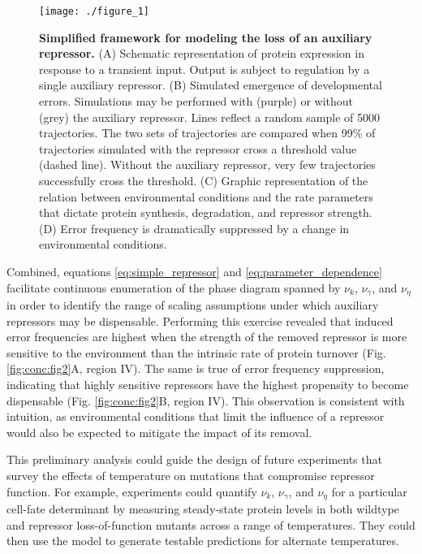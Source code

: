 \begin{figure}[h!]
\centering
\texttt{[image: ./figure\_1]}
\caption[Simplified framework for modeling the loss of an auxiliary repressor.]{\textbf{Simplified framework for modeling the loss of an auxiliary repressor.} (A) Schematic representation of protein expression in response to a transient input. Output is subject to regulation by a single auxiliary repressor. (B) Simulated emergence of developmental errors. Simulations may be performed with (purple) or without (grey) the auxiliary repressor. Lines reflect a random sample of 5000 trajectories. The two sets of trajectories are compared when 99\% of trajectories simulated with the repressor cross a threshold value (dashed line). Without the auxiliary repressor, very few trajectories successfully cross the threshold. (C) Graphic representation of the relation between environmental conditions and the rate parameters that dictate protein synthesis, degradation, and repressor strength. (D) Error frequency is dramatically suppressed by a change in environmental conditions. }
\label{fig:conc:fig1}
\end{figure}

Combined, equations \ref{eq:simple_repressor} and \ref{eq:parameter_dependence} facilitate continuous enumeration of the phase diagram spanned by $\nu_k$, $\nu_{\gamma}$, and $\nu_{\eta}$ in order to identify the range of scaling assumptions under which auxiliary repressors may be dispensable. Performing this exercise revealed that induced error frequencies are highest when the strength of the removed repressor is more sensitive to the environment than the intrinsic rate of protein turnover (Fig. \ref{fig:conc:fig2}A, region IV). The same is true of error frequency suppression, indicating that highly sensitive repressors have the highest propensity to become dispensable (Fig. \ref{fig:conc:fig2}B, region IV). This observation is consistent with intuition, as environmental conditions that limit the influence of a repressor would also be expected to mitigate the impact of its removal. 

This preliminary analysis could guide the design of future experiments that survey the effects of temperature on mutations that compromise repressor function. For example, experiments could quantify $\nu_k$, $\nu_{\gamma}$, and $\nu_{\eta}$ for a particular cell-fate determinant by measuring steady-state protein levels in both wildtype and repressor loss-of-function mutants across a range of temperatures. They could then use the model to generate testable predictions for alternate temperatures.

